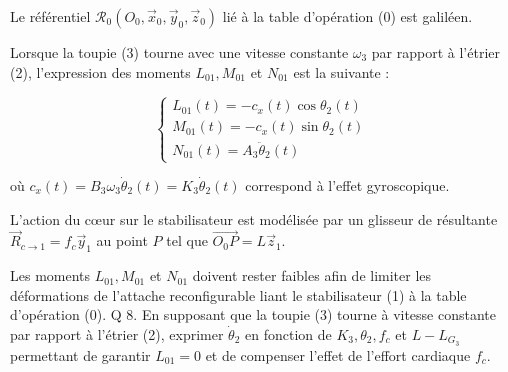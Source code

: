Le référentiel $\mathcal{R}_{0}\left(O_{0}, \vec{x}_{0}, \vec{y}_{0}, \vec{z}_{0}\right)$ lié à la table d'opération (0) est galiléen.




Lorsque la toupie (3) tourne avec une vitesse constante $\omega_{3}$ par rapport à l'étrier (2), l'expression des moments $L_{01}, M_{01}$ et $N_{01}$ est la suivante :

$$
\left\{\begin{array}{l}
L_{01}(t)=-c_{x}(t) \cos \theta_{2}(t) \\
M_{01}(t)=-c_{x}(t) \sin \theta_{2}(t) \\
N_{01}(t)=A_{3} \ddot{\theta}_{2}(t)
\end{array}\right.
$$

où $c_{x}(t)=B_{3} \omega_{3} \dot{\theta}_{2}(t)=K_{3} \dot{\theta}_{2}(t)$ correspond à l'effet gyroscopique.

L'action du cœur sur le stabilisateur est modélisée par un glisseur de résultante $\vec{R}_{c \rightarrow 1}=f_{c} \vec{y}_{1}$ au point $P$ tel que $\overrightarrow{O_{0} P}=L \vec{z}_{1}$.

Les moments $L_{01}, M_{01}$ et $N_{01}$ doivent rester faibles afin de limiter les déformations de l'attache reconfigurable liant le stabilisateur (1) à la table d'opération (0). Q 8. En supposant que la toupie (3) tourne à vitesse constante par rapport à l'étrier (2), exprimer $\dot{\theta}_{2}$ en fonction de $K_{3}, \theta_{2}, f_{c}$ et $L-L_{G_{3}}$ permettant de garantir $L_{01}=0$ et de compenser l'effet de l'effort cardiaque $f_{c}$.


